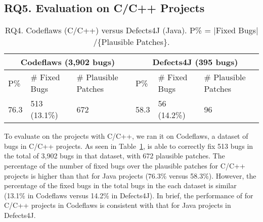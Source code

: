 \subsection{\bf RQ5. Evaluation on C/C++ Projects}
\label{sec:eval-c}

\begin{table}[t]
	\caption{RQ4. Codeflaws (C/C++) versus Defects4J (Java). P\% = $|$Fixed Bugs$|$/\{Plausible Patches\}.}
	\vspace{-5pt}
	{\footnotesize
		\begin{center}
			\tabcolsep 2.7pt
			\begin{tabular}{p{0.5cm}<{\centering}|p{1.7cm}<{\centering}|p{1.55cm}<{\centering}|p{0.5cm}<{\centering}|p{1.7cm}<{\centering}|p{1.55cm}<{\centering}}\hline	
				
				\multicolumn{3}{c|}{Codeflaws (3,902 bugs)} & \multicolumn{3}{c}{Defects4J (395 bugs)}\\\hline
				 P\%& \# Fixed Bugs & \# Plausible Patches &P\%& \# Fixed Bugs & \# Plausible Patches \\ \hline
				
				  76.3  &        513 (13.1\%)      &            672             &  58.3 &          56 (14.2\%)       &        96                 \\
				\hline

			\end{tabular}
			\label{RQ5}
		\end{center}
	}
\end{table}
  
To evaluate {\tool} on the projects with C/C++, we ran it on
Codeflaws, a dataset of bugs in C/C++ projects.  As seen in
Table~\ref{RQ5}, {\tool} is able to correctly fix 513 bugs in the
total of 3,902 bugs in that dataset, with 672 plausible patches. The
percentage of the number of fixed bugs over the plausible patches for
C/C++ projects is higher than that for Java projects (76.3\% versus
58.3\%). However, the percentage of the fixed bugs in the total bugs
in the each dataset is similar (13.1\% in Codeflaws versus 14.2\% in
Defects4J). In brief, the performance of {\tool} for C/C++ projects in
Codeflaws is consistent with that for Java projects in Defects4J.








